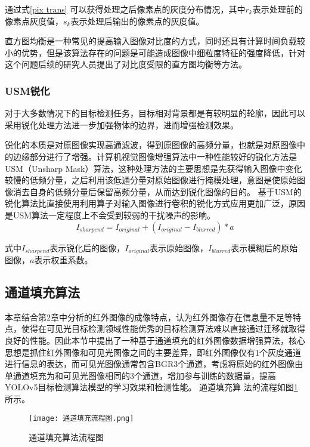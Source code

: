 通过式\ref{pix trans}
可以获得处理之后像素点的灰度分布情况，其中$r_{k}$表示处理前的像素点灰度值，$s_{k}$表示处理后输出的像素点的灰度值。

直方图均衡是一种常见的提高输入图像对比度的方式，同时还具有计算时间负载较小的优势，但是该算法存在的问题是可能造成图像中细粒度特征的强度降低，针对这个问题后续的研究人员提出了对比度受限的直方图均衡等方法。

\subsubsection{USM锐化}
对于大多数情况下的目标检测任务，目标相对背景都是有较明显的轮廓，因此可以采用锐化处理方法进一步加强物体的边界，进而增强检测效果。

锐化的本质是对原图像实现高通滤波，得到原图像的高频分量，也就是对原图像中的边缘部分进行了增强。计算机视觉图像增强算法中一种性能较好的锐化方法是USM（Unsharp Mask）算法，这种处理方法的主要思想是先获得输入图像中变化较慢的低频分量，之后利用该低通分量对原始图像进行掩模处理，意图是使原始图像消去自身的低频分量后保留高频分量，从而达到锐化图像的目的。
基于USM的锐化算法比直接使用利用算子对输入图像进行卷积的锐化方式应用更加广泛，原因是USM算法一定程度上不会受到较弱的干扰噪声的影响。
\begin{equation}
  I_{sharpend}=I_{original}+(I_{original}-I_{blurred})*a
\end{equation}

式中$I_{sharpend}$表示锐化后的图像，$I_{original}$表示原始图像，$I_{blurred}$表示模糊后的原始图像，$a$表示权重系数。

\subsection{通道填充算法}
本章结合第2章中分析的红外图像的成像特点，认为红外图像存在信息量不足等特点，使得在可见光目标检测领域性能优秀的目标检测算法难以直接通过迁移就取得良好的性能。因此本节中提出了一种基于通道填充的红外图像数据增强算法，核心思想是抓住红外图像和可见光图像之间的主要差异，即红外图像仅有1个灰度通道进行信息的表达，而可见光图像通常包含BGR3个通道，考虑将原始的红外图像由单通道填充为和可见光图像相同的3个通道，增加参与训练的数据量，提高YOLOv5目标检测算法模型的学习效果和检测性能。
通道填充算
法的流程如图\ref{tdtc}所示。

\begin{figure}[h]
  \centering
  \texttt{[image: 通道填充流程图.png]}
  \caption{通道填充算法流程图}
  \label{tdtc}
\end{figure}

